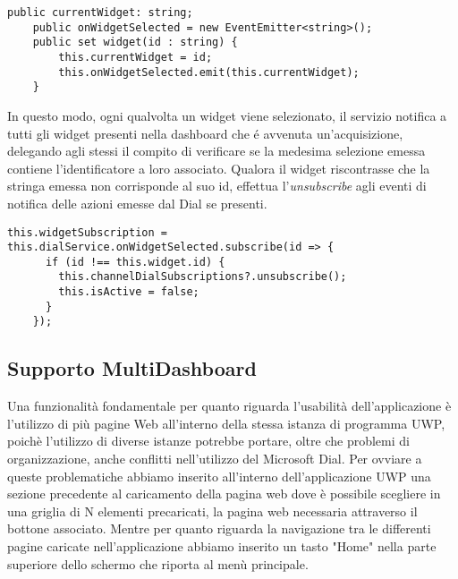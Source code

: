 \vspace{1.0cm}
\begin{lstlisting}[caption={Notifica selezione Widget e salvataggio id},style=javaScriptCode]
    public currentWidget: string;
    public onWidgetSelected = new EventEmitter<string>();
    public set widget(id : string) {
        this.currentWidget = id;
        this.onWidgetSelected.emit(this.currentWidget);
    }
\end{lstlisting} 
\vspace{1.0cm}

In questo modo, ogni qualvolta un widget viene selezionato, il servizio notifica a tutti gli widget presenti nella dashboard che é avvenuta un'acquisizione, delegando agli stessi il compito di verificare se la medesima selezione emessa contiene l'identificatore a loro associato. Qualora il widget riscontrasse che la stringa emessa non corrisponde al suo id, effettua l'\emph{unsubscribe} agli eventi di notifica delle azioni emesse dal Dial se presenti.

\vspace{1.0cm}
\begin{lstlisting}[caption={Sottoscrizione all'evento di notifica selezione Widget},style=javaScriptCode]
this.widgetSubscription = this.dialService.onWidgetSelected.subscribe(id => {
      if (id !== this.widget.id) {
        this.channelDialSubscriptions?.unsubscribe();
        this.isActive = false;
      }
    });
\end{lstlisting} 
\vspace{1.0cm}

\subsection{Supporto MultiDashboard}
Una funzionalità fondamentale per quanto riguarda l'usabilità dell'applicazione è l'utilizzo di più pagine Web all'interno della stessa istanza di programma UWP, poichè l'utilizzo di diverse istanze potrebbe portare, oltre che problemi di organizzazione, anche conflitti nell'utilizzo del Microsoft Dial. Per ovviare a queste problematiche abbiamo inserito all'interno dell'applicazione UWP una sezione precedente al caricamento della pagina web dove è possibile scegliere in una griglia di N elementi precaricati, la pagina web necessaria attraverso il bottone associato.
Mentre per quanto riguarda la navigazione tra le differenti pagine caricate nell'applicazione abbiamo inserito un tasto "Home" nella parte superiore dello schermo che riporta al menù principale.

